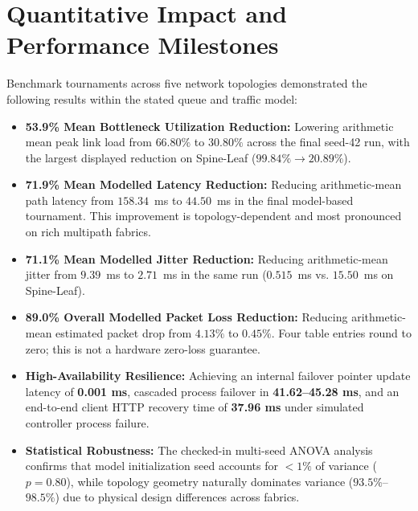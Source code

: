 \documentclass[12pt,a4paper,oneside]{report}
\begin{document}
\section{Quantitative Impact and Performance Milestones}
Benchmark tournaments across five network topologies demonstrated the following results within the stated queue and traffic model:
\begin{itemize}
    \item \textbf{53.9\% Mean Bottleneck Utilization Reduction:} Lowering arithmetic mean peak link load from $66.80\%$ to $30.80\%$ across the final seed-42 run, with the largest displayed reduction on Spine-Leaf ($99.84\% \to 20.89\%$).
    \item \textbf{71.9\% Mean Modelled Latency Reduction:} Reducing arithmetic-mean path latency from $158.34$~ms to $44.50$~ms in the final model-based tournament. This improvement is topology-dependent and most pronounced on rich multipath fabrics.
    \item \textbf{71.1\% Mean Modelled Jitter Reduction:} Reducing arithmetic-mean jitter from $9.39$~ms to $2.71$~ms in the same run ($0.515$~ms vs. $15.50$~ms on Spine-Leaf).
    \item \textbf{89.0\% Overall Modelled Packet Loss Reduction:} Reducing arithmetic-mean estimated packet drop from $4.13\%$ to $0.45\%$. Four table entries round to zero; this is not a hardware zero-loss guarantee.
    \item \textbf{High-Availability Resilience:} Achieving an internal failover pointer update latency of \textbf{0.001 ms}, cascaded process failover in \textbf{41.62--45.28 ms}, and an end-to-end client HTTP recovery time of \textbf{37.96 ms} under simulated controller process failure.
    \item \textbf{Statistical Robustness:} The checked-in multi-seed ANOVA analysis confirms that model initialization seed accounts for $<1\%$ of variance ($p = 0.80$), while topology geometry naturally dominates variance ($93.5\%$--$98.5\%$) due to physical design differences across fabrics.
\end{itemize}
\end{document}
